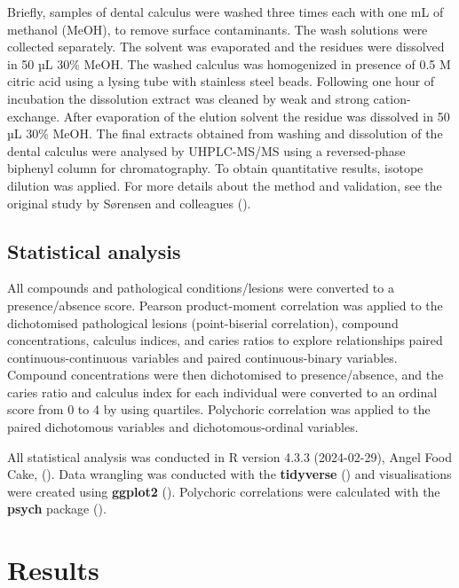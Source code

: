 \documentclass[
  11pt,
  leqno]{scrartcl}
\begin{document}
Briefly, samples of dental calculus were washed three times each with
one mL of methanol (MeOH), to remove surface contaminants. The wash
solutions were collected separately. The solvent was evaporated and the
residues were dissolved in 50 µL 30\% MeOH. The washed calculus was
homogenized in presence of 0.5 M citric acid using a lysing tube with
stainless steel beads. Following one hour of incubation the dissolution
extract was cleaned by weak and strong cation-exchange. After
evaporation of the elution solvent the residue was dissolved in 50 µL
30\% MeOH. The final extracts obtained from washing and dissolution of
the dental calculus were analysed by UHPLC-MS/MS using a reversed-phase
biphenyl column for chromatography. To obtain quantitative results,
isotope dilution was applied. For more details about the method and
validation, see the original study by Sørensen and colleagues
().

\subsection{Statistical analysis}\label{statistical-analysis}

All compounds and pathological conditions/lesions were converted to a
presence/absence score. Pearson product-moment correlation was applied
to the dichotomised pathological lesions (point-biserial correlation),
compound concentrations, calculus indices, and caries ratios to explore
relationships paired continuous-continuous variables and paired
continuous-binary variables. Compound concentrations were then
dichotomised to presence/absence, and the caries ratio and calculus
index for each individual were converted to an ordinal score from 0 to 4
by using quartiles. Polychoric correlation was applied to the paired
dichotomous variables and dichotomous-ordinal variables.

All statistical analysis was conducted in R version 4.3.3 (2024-02-29),
Angel Food Cake, (). Data
wrangling was conducted with the \textbf{tidyverse}
() and visualisations
were created using \textbf{ggplot2} (). Polychoric correlations were calculated with the \textbf{psych}
package ().

\section{Results}\label{results}
\end{document}
